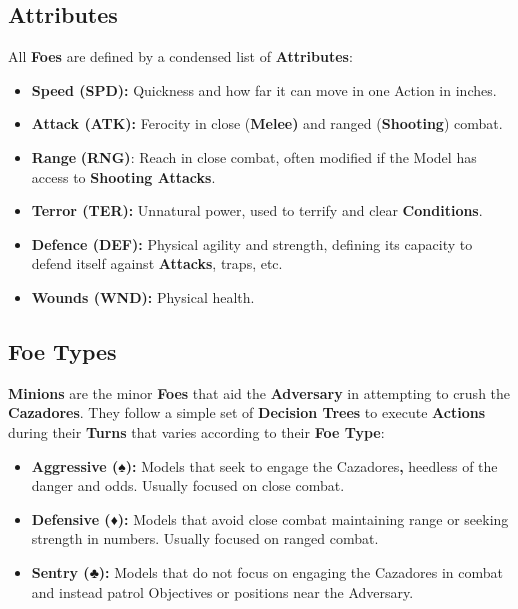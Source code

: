 \documentclass[
]{book}
\providecommand{\tightlist}{%
  \setlength{\itemsep}{0pt}\setlength{\parskip}{0pt}}
\begin{document}
\hypertarget{fattributes}{%
\subsection*{Attributes}\label{fattributes}}

All \textbf{Foes} are defined by a condensed list of \textbf{Attributes}:

\begin{itemize}
\tightlist
\item
  \textbf{Speed (SPD):} Quickness and how far it can move in one Action in inches.
\item
  \textbf{Attack (ATK):} Ferocity in close (\textbf{Melee)} and ranged (\textbf{Shooting}) combat.
\item
  \textbf{Range} \textbf{(RNG)}: Reach in close combat, often modified if the Model has access to \textbf{Shooting Attacks}.
\item
  \textbf{Terror (TER):} Unnatural power, used to terrify and clear \textbf{Conditions}.
\item
  \textbf{Defence (DEF):} Physical agility and strength, defining its capacity to defend itself against \textbf{Attacks}, traps, etc.
\item
  \textbf{Wounds (WND):} Physical health.
\end{itemize}

\hypertarget{ftypes}{%
\subsection*{Foe Types}\label{ftypes}}

\textbf{Minions} are the minor \textbf{Foes} that aid the \textbf{Adversary} in attempting to crush the \textbf{Cazadores}. They follow a simple set of \textbf{Decision Trees} to execute \textbf{Actions} during their \textbf{Turns} that varies according to their \textbf{Foe Type}:

\begin{itemize}
\tightlist
\item
  \textbf{Aggressive (♠):} Models that seek to engage the Cazadores\textbf{,} heedless of the danger and odds. Usually focused on close combat.
\item
  \textbf{Defensive (♦):} Models that avoid close combat maintaining range or seeking strength in numbers. Usually focused on ranged combat.
\item
  \textbf{Sentry (♣):} Models that do not focus on engaging the Cazadores in combat and instead patrol Objectives or positions near the Adversary.
\end{itemize}
\end{document}
